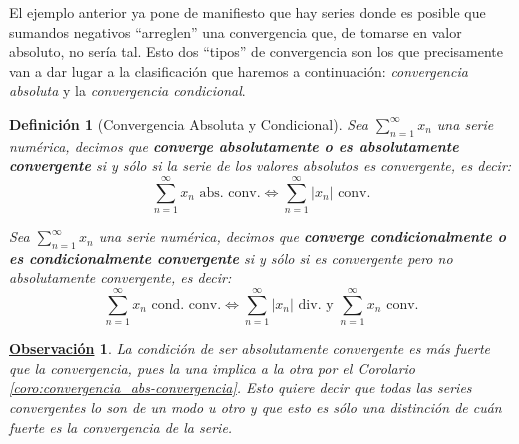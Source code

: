 \documentclass[10pt,a4paper,openright]{book}
\theoremstyle{break}
\newtheorem{defi}{Definición}[chapter]
\newtheorem{obs}{\underline{Observación}}[chapter]
\begin{document}
El ejemplo anterior ya pone de manifiesto que hay series donde es posible que sumandos negativos ``arreglen'' una convergencia que, de tomarse en valor absoluto, no sería tal. Esto dos ``tipos'' de convergencia son los que precisamente van a dar lugar a la clasificación que haremos a continuación: \textit{convergencia absoluta} y la \textit{convergencia condicional}.

\begin{defi}[Convergencia Absoluta y Condicional]
Sea $\sum_{n = 1}^{\infty} x_n$ una serie numérica, decimos que \textbf{converge absolutamente o es absolutamente convergente} si y sólo si la serie de los valores absolutos es convergente, es decir:
\[
\sum_{n = 1}^{\infty} x_n\mbox{ abs. conv.} \Leftrightarrow \sum_{n=1}^{\infty} |x_n|\mbox{ conv.}
\]

Sea $\sum_{n = 1}^{\infty} x_n$ una serie numérica, decimos que \textbf{converge condicionalmente o es condicionalmente convergente} si y sólo si es convergente pero no absolutamente convergente, es decir:
\[
\sum_{n = 1}^{\infty} x_n\mbox{ cond. conv.} \Leftrightarrow \sum_{n=1}^{\infty} |x_n|\mbox{ div. y } \sum_{n = 1}^{\infty} x_n \mbox{ conv.}
\]
\end{defi}

\begin{obs}
La condición de ser absolutamente convergente es más fuerte que la convergencia, pues la una implica a la otra por el Corolario \ref{coro:convergencia_abs-convergencia}. Esto quiere decir que todas las series convergentes lo son de un modo u otro y que esto es sólo una distinción de cuán fuerte es la convergencia de la serie.
\end{obs}
\end{document}
